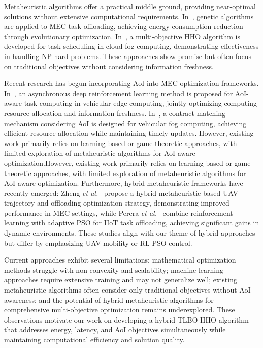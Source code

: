 \documentclass[conference]{IEEEtran}
\begin{document}
Metaheuristic algorithms offer a practical middle ground, providing near-optimal solutions without extensive computational requirements. In~\cite{li2020genetic}, genetic algorithms are applied to MEC task offloading, achieving energy consumption reduction through evolutionary optimization. In~\cite{ali2024multiobjective}, a multi-objective HHO algorithm is developed for task scheduling in cloud-fog computing, demonstrating effectiveness in handling NP-hard problems. These approaches show promise but often focus on traditional objectives without considering information freshness.

Recent research has begun incorporating AoI into MEC optimization frameworks. In~\cite{liu2023asynchronous}, an asynchronous deep reinforcement learning method is proposed for AoI-aware task computing in vehicular edge computing, jointly optimizing computing resource allocation and information freshness. In~\cite{zhou2019computation}, a contract matching mechanism considering AoI is designed for vehicular fog computing, achieving efficient resource allocation while maintaining timely updates. However, existing work primarily relies on learning-based or game-theoretic approaches, with limited exploration of metaheuristic algorithms for AoI-aware optimization.However, existing work primarily relies on learning-based or game-theoretic approaches, with limited exploration of metaheuristic algorithms for AoI-aware optimization.
Furthermore, hybrid metaheuristic frameworks have recently emerged: Zheng \emph{et al.}~\cite{Zheng_2025} propose a hybrid metaheuristic-based UAV trajectory and offloading optimization strategy, demonstrating improved performance in MEC settings, while Perera \emph{et al.}~\cite{Perera_2025} combine reinforcement learning with adaptive PSO for IIoT task offloading, achieving significant gains in dynamic environments.
These studies align with our theme of hybrid approaches but differ by emphasizing UAV mobility or RL-PSO control.

Current approaches exhibit several limitations: mathematical optimization methods struggle with non-convexity and scalability; machine learning approaches require extensive training and may not generalize well; existing metaheuristic algorithms often consider only traditional objectives without AoI awareness; and the potential of hybrid metaheuristic algorithms for comprehensive multi-objective optimization remains underexplored. These observations motivate our work on developing a hybrid TLBO-HHO algorithm that addresses energy, latency, and AoI objectives simultaneously while maintaining computational efficiency and solution quality.
\end{document}

